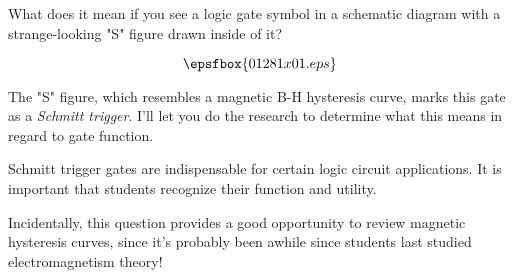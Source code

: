 

What does it mean if you see a logic gate symbol in a schematic diagram with a strange-looking "S" figure drawn inside of it?

$$\epsfbox{01281x01.eps}$$







The "S" figure, which resembles a magnetic B-H hysteresis curve, marks this gate as a {\it Schmitt trigger}.  I'll let you do the research to determine what this means in regard to gate function.







Schmitt trigger gates are indispensable for certain logic circuit applications.  It is important that students recognize their function and utility.

Incidentally, this question provides a good opportunity to review magnetic hysteresis curves, since it's probably been awhile since students last studied electromagnetism theory!




